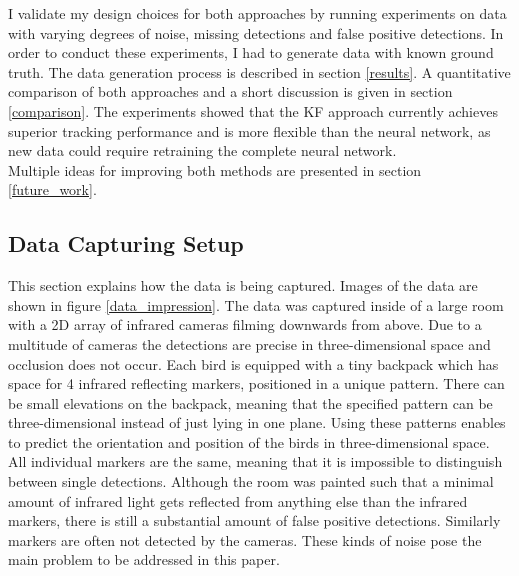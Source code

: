 \documentclass[12pt,a4paper]{article}
\begin{document}
I validate my design choices for both approaches by running experiments on data with varying degrees of noise, missing detections and false positive detections. In order to conduct these experiments, I had to generate data with known ground truth. The data generation process is described in section \ref{results}. A quantitative comparison of both approaches and a short discussion is given in section \ref{comparison}. The experiments showed that the KF approach currently achieves superior tracking performance and is more flexible than the neural network, as new data could require retraining the complete neural network. %
\\
Multiple ideas for improving both methods are presented in section \ref{future_work}. %







\subsection{Data Capturing Setup}
\label{data_setup}


This section explains how the data is being captured. Images of the data are shown in figure \ref{data_impression}.
The data was captured inside of a large room with a 2D array of infrared cameras filming downwards from above. Due to a multitude of cameras the detections are precise in three-dimensional space and occlusion does not occur. Each bird is equipped with a tiny backpack which has space for 4 infrared reflecting markers, positioned in a unique pattern. There can be small elevations on the backpack, meaning that the specified pattern can be three-dimensional instead of just lying in one plane. Using these patterns enables to predict the orientation and position of the birds in three-dimensional space. All individual markers are the same, meaning that it is impossible to distinguish between single detections.  Although the room was painted such that a minimal amount of infrared light gets reflected from anything else than the infrared markers, there is still a substantial amount of false positive detections. Similarly markers are often not detected by the cameras. These kinds of noise pose the main problem to be addressed in this paper.   %
\end{document}
